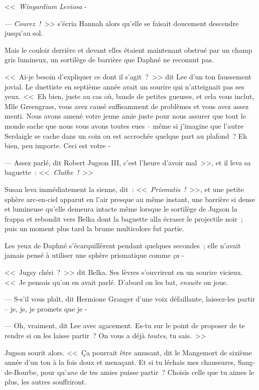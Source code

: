 <<~\emph{Wingardium Leviosa} -

--- \emph{Courez~!}~>> s'écria Hannah alors qu'elle se faisait doucement descendre jusqu'au sol.

Mais le couloir derrière et devant elles étaient maintenant obstrué par un champ gris lumineux, un sortilège de barrière que Daphné ne reconnut pas.

<<~Ai-je besoin d'expliquer ce dont il s'agit~?~>> dit Lee d'un ton faussement jovial. Le duettiste en septième année avait un sourire qui n'atteignait pas ses yeux. <<~Eh bien, juste au cas où, bande de petites gueuses, et cela vous inclut, Mlle Greengrass, vous avez causé suffisamment de problèmes et vous avez assez menti. Nous avons amené votre jeune amie juste pour nous assurer que tout le monde sache que nous vous avons toutes eues -- même si j'imagine que l'autre Serdaigle se cache dans un coin ou est accrochée quelque part au plafond~? Eh bien, peu importe. Ceci est votre -

--- Assez parlé, dit Robert Jugson III, c'est l'heure d'avoir mal~>>, et il leva sa baguette~: <<~\emph{Cluthe~!}~>>

Susan leva immédiatement la sienne, dit~: <<~\emph{Prismatis~!}~>>, et une petite sphère arc-en-ciel apparut en l'air presque au même instant, une barrière si dense et lumineuse qu'elle demeura intacte même lorsque le sortilège de Jugson la frappa et rebondit vers Belka dont la baguette alla écraser le projectile noir~; puis un moment plus tard la brume multicolore fut partie.

Les yeux de Daphné s'écarquillèrent pendant quelques secondes~; elle n'avait jamais pensé à utiliser une sphère prismatique comme \emph{ça} -

<<~Jugsy chéri~?~>> dit Belka. Ses lèvres s'ouvrirent en un sourire vicieux. <<~Je pensais qu'on en avait parlé. D'abord on les bat, \emph{ensuite} on joue.

--- S-s'il vous plaît, dit Hermione Granger d'une voix défaillante, laissez-les partir -- je, je, je promets que je -

--- Oh, vraiment, dit Lee avec agacement. Es-tu sur le point de proposer de te rendre si on les laisse partir~? On vous a déjà \emph{toutes}, tu sais.~>>

Jugson sourit alors. <<~Ça pourrait être amusant, dit le Mangemort de sixième année d'un ton à la fois doux et menaçant. Et si tu léchais mes chaussures, Sang-de-Bourbe, pour qu'\emph{une} de tes amies puisse partir~? Choisis celle que tu aimes le plus, les autres souffriront.

